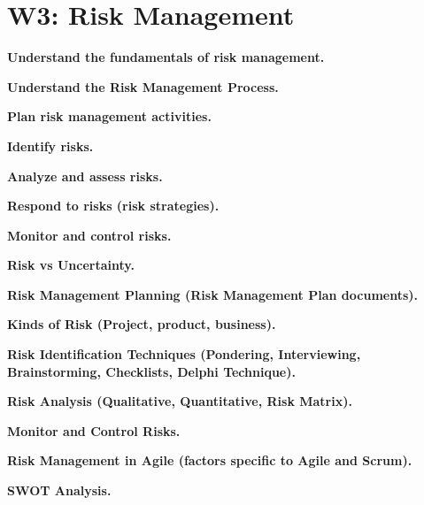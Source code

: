 \section{W3: Risk Management}

\textbf{Understand the fundamentals of risk management.}

\textbf{Understand the Risk Management Process.}

    \textbf{Plan risk management activities.}

    \textbf{Identify risks.}

    \textbf{Analyze and assess risks.}

    \textbf{Respond to risks (risk strategies).}

    \textbf{Monitor and control risks.}

    \textbf{Risk vs Uncertainty.}

    \textbf{Risk Management Planning (Risk Management Plan documents).}

    \textbf{Kinds of Risk (Project, product, business).}

    \textbf{Risk Identification Techniques (Pondering, Interviewing, Brainstorming, Checklists, Delphi Technique).}

    \textbf{Risk Analysis (Qualitative, Quantitative, Risk Matrix).}

    \textbf{Monitor and Control Risks.}

    \textbf{Risk Management in Agile (factors specific to Agile and Scrum).}

    \textbf{SWOT Analysis.}
